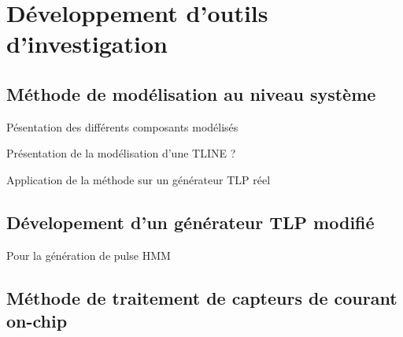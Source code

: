 \chapter{Développement d'outils d'investigation}

\section{Méthode de modélisation au niveau système}

Pésentation des différents composants modélisés

Présentation de la modélisation d'une TLINE ?

Application de la méthode sur un générateur TLP réel

\section{Dévelopement d'un générateur TLP modifié}

Pour la génération de pulse HMM

\section{Méthode de traitement de capteurs de courant on-chip}
